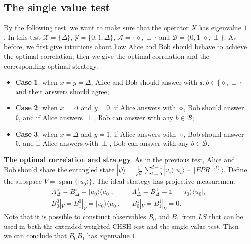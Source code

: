 \documentclass[11pt,letterpaper]{article}
\newcommand{\ket}[1]{|#1\rangle}
\newcommand{\ketbra}[2]{|#1\rangle\langle#2|}
\DeclareMathOperator{\spn}{span}
\newcommand{\calX}{\mathcal{X}}
\newcommand{\calY}{\mathcal{Y}}
\newcommand{\calA}{\mathcal{A}}
\newcommand{\calB}{\mathcal{B}}
\newcommand{\1}{\mathbb{1}}
\newcommand{\EPR}[1]{EPR^{(#1)}}
\newcommand{\LS}{LS}
\newcommand{\tri}{\Delta}
\theoremstyle{definition}
\begin{document}
\subsection{The single value test}
By the following test, we want to make sure that the operator $X$ has eigenvalue $1$.
In this test $\calX = \{\tri \}$, $\calY = \{0,1,\tri\}$, $\calA = \{\diamond, \perp\}$ and $\calB = \{0,1, \diamond, \perp\}$.
As before, we first give intuitions about how Alice and Bob should behave to achieve the optimal correlation, then
we give the optimal correlation and the corresponding optimal strategy.
\begin{itemize}
	\item \textbf{Case 1}: when $x = y = \tri$, Alice and Bob should answer with $a, b \in \{\diamond, \perp\}$ and 
	their answers should agree;
	\item \textbf{Case 2}: when $x =\tri$ and $y = 0$, if Alice answers with $\diamond$, Bob should answer $0$, and if 
	Alice answers $\perp$, Bob can answer with any $b \in \calB$;
	\item \textbf{Case 3}: when $x = \tri$ and $y = 1$, if Alice answers with $\diamond$, Bob should answer $0$, and if  
	Alice answers with $\perp$, Bob can answer with any $b \in \calB$.
\end{itemize}

\textbf{The optimal correlation and strategy}.
As in the previous test, Alice and Bob should share the entangled state
$\ket{\psi} = \frac{1}{\sqrt{d}}\sum_{i=0}^{d-1} \ket{u_i}\ket{u_i} \sim \ket{\EPR{d}}$.
Define the subspace $V = \spn\{ \ket{u_0} \}$.
The ideal strategy has projective measurement 
\begin{align*}
&A_\tri^\diamond = B_\tri^\diamond= \ketbra{u_0}{u_0}, 
&&A_\tri^\perp = B_\tri^\perp = \1 - \ketbra{u_0}{u_0},\\
&B_0^0|_V = B_1^0|_V = \ketbra{u_0}{u_0}, 
&&B_0^1|_V = B_1^1|_V = 0.
\end{align*}
Note that it is possible to construct observables $B_0$ and $B_1$ from $\LS$
that can be used in both the extended weighted CHSH test and the single value test.
Then we can conclude that $B_0B_1$ has eigenvalue $1$.
\end{document}
